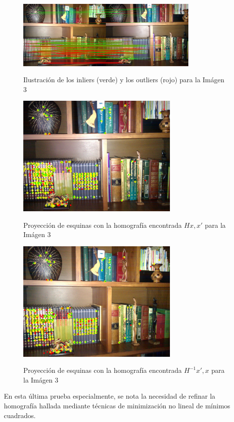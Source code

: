 \documentclass{IEEEtran}
\begin{document}
\begin{figure}[H]
\caption{Ilustración de los inliers (verde) y los outliers (rojo) para la Imágen 3}
\centering
\includegraphics[width=9cm,natwidth=1200,natheight=450]{figs/bigimg_3.png}
\label{fig:bigimg_3}
\end{figure}

\begin{figure}[H]
\caption{Proyección de esquinas con la homografía encontrada $Hx, x'$ para la Imágen 3}
\centering
\includegraphics[width=8cm,natwidth=600,natheight=450]{figs/img2_3.png}
\label{fig:img2_3}
\end{figure}

\begin{figure}[H]
\caption{Proyección de esquinas con la homografía encontrada $H^{-1}x', x$ para la Imágen 3}
\centering
\includegraphics[width=8cm,natwidth=600,natheight=450]{figs/img1_3.png}
\label{fig:img1_3}
\end{figure}

En esta última prueba especialmente, se nota la necesidad de refinar la
homografía hallada mediante técnicas de minimización no lineal de 
mínimos cuadrados.
\end{document}
